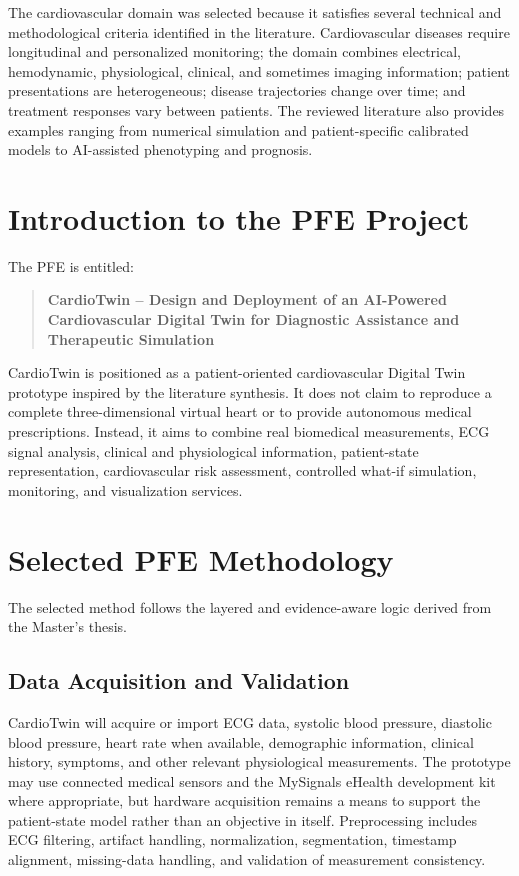 The cardiovascular domain was selected because it satisfies several technical and methodological criteria identified in the literature. Cardiovascular diseases require longitudinal and personalized monitoring; the domain combines electrical, hemodynamic, physiological, clinical, and sometimes imaging information; patient presentations are heterogeneous; disease trajectories change over time; and treatment responses vary between patients. The reviewed literature also provides examples ranging from numerical simulation and patient-specific calibrated models to AI-assisted phenotyping and prognosis.

\section{Introduction to the PFE Project}
The PFE is entitled:

\begin{quote}
\textbf{CardioTwin -- Design and Deployment of an AI-Powered Cardiovascular Digital Twin for Diagnostic Assistance and Therapeutic Simulation}
\end{quote}

CardioTwin is positioned as a patient-oriented cardiovascular Digital Twin prototype inspired by the literature synthesis. It does not claim to reproduce a complete three-dimensional virtual heart or to provide autonomous medical prescriptions. Instead, it aims to combine real biomedical measurements, ECG signal analysis, clinical and physiological information, patient-state representation, cardiovascular risk assessment, controlled what-if simulation, monitoring, and visualization services.

\section{Selected PFE Methodology}
The selected method follows the layered and evidence-aware logic derived from the Master’s thesis.

\subsection{Data Acquisition and Validation}
CardioTwin will acquire or import ECG data, systolic blood pressure, diastolic blood pressure, heart rate when available, demographic information, clinical history, symptoms, and other relevant physiological measurements. The prototype may use connected medical sensors and the MySignals eHealth development kit where appropriate, but hardware acquisition remains a means to support the patient-state model rather than an objective in itself. Preprocessing includes ECG filtering, artifact handling, normalization, segmentation, timestamp alignment, missing-data handling, and validation of measurement consistency.

